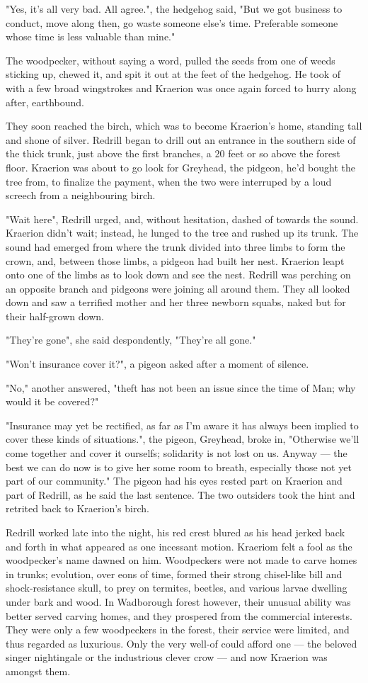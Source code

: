 "Yes, it's all very bad. All agree.", the hedgehog said, "But we got business to conduct, move along then, go waste someone else's time. Preferable someone whose time is less valuable than mine."

The woodpecker, without saying a word, pulled the seeds from one of weeds sticking up, chewed it, and spit it out at the feet of the hedgehog. He took of with a few broad wingstrokes and Kraerion was once again forced to hurry along after, earthbound.

They soon reached the birch, which was to become Kraerion's home, standing tall and shone of silver. Redrill began to drill out an entrance in the southern side of the thick trunk, just above the first branches, a 20 feet or so above the forest floor. Kraerion was about to go look for Greyhead, the pidgeon, he'd bought the tree from, to finalize the payment, when the two were interruped by a loud screech from a neighbouring birch.

"Wait here", Redrill urged, and, without hesitation, dashed of towards the sound. Kraerion didn't wait; instead, he lunged to the tree and rushed up its trunk. The sound had emerged from where the trunk divided into three limbs to form the crown, and, between those limbs, a pidgeon had built her nest. Kraerion leapt onto one of the limbs as to look down and see the nest. Redrill was perching on an opposite branch and pidgeons were joining all around them. They all looked down and saw a terrified mother and her three newborn squabs, naked but for their half-grown down.

"They're gone", she said despondently, "They're all gone."

"Won't insurance cover it?", a pigeon asked after a moment of silence.

"No," another answered, "theft has not been an issue since the time of Man; why would it be covered?"

"Insurance may yet be rectified, as far as I'm aware it has always been implied to cover these kinds of situations.", the pigeon, Greyhead, broke in, "Otherwise we'll come together and cover it ourselfs; solidarity is not lost on us. Anyway — the best we can do now is to give her some room to breath, especially those not yet part of our community." The pigeon had his eyes rested part on Kraerion and part of Redrill, as he said the last sentence. The two outsiders took the hint and retrited back to Kraerion's birch.

Redrill worked late into the night, his red crest blured as his head jerked back and forth in what appeared as one incessant motion. Kraeriom felt a fool as the woodpecker's name dawned on him.
Woodpeckers were not made to carve homes in trunks; evolution, over eons of time, formed their strong chisel-like bill and shock-resistance skull, to prey on termites, beetles, and various larvae dwelling under bark and wood. In Wadborough forest however, their unusual ability was better served carving homes, and they prospered from the commercial interests. They were only a few woodpeckers in the forest, their service were limited, and thus regarded as luxurious. Only the very well-of could afford one — the beloved singer nightingale or the industrious clever crow — and now Kraerion was amongst them.

